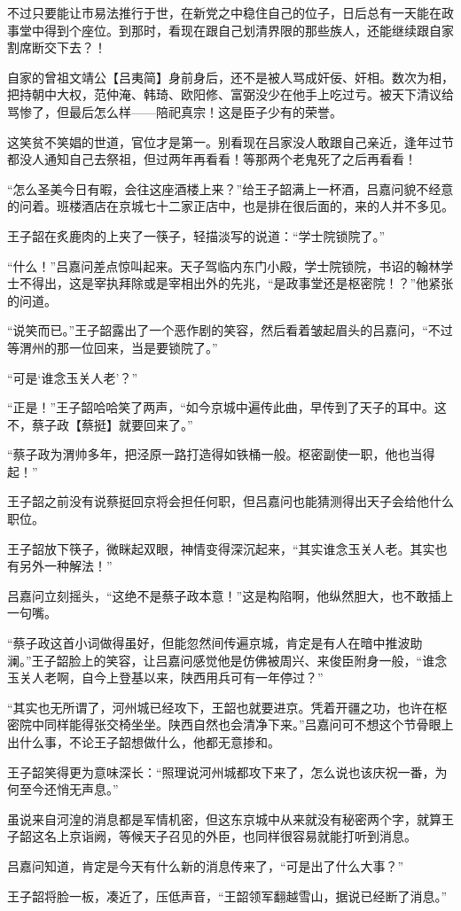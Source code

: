 不过只要能让市易法推行于世，在新党之中稳住自己的位子，日后总有一天能在政事堂中得到个座位。到那时，看现在跟自己划清界限的那些族人，还能继续跟自家割席断交下去？！

自家的曾祖文靖公【吕夷简】身前身后，还不是被人骂成奸佞、奸相。数次为相，把持朝中大权，范仲淹、韩琦、欧阳修、富弼没少在他手上吃过亏。被天下清议给骂惨了，但最后怎么样——陪祀真宗！这是臣子少有的荣誉。

这笑贫不笑娼的世道，官位才是第一。别看现在吕家没人敢跟自己亲近，逢年过节都没人通知自己去祭祖，但过两年再看看！等那两个老鬼死了之后再看看！

“怎么圣美今日有暇，会往这座酒楼上来？”给王子韶满上一杯酒，吕嘉问貌不经意的问着。班楼酒店在京城七十二家正店中，也是排在很后面的，来的人并不多见。

王子韶在炙鹿肉的上夹了一筷子，轻描淡写的说道：“学士院锁院了。”

“什么！”吕嘉问差点惊叫起来。天子驾临内东门小殿，学士院锁院，书诏的翰林学士不得出，这是宰执拜除或是宰相出外的先兆，“是政事堂还是枢密院！？”他紧张的问道。

“说笑而已。”王子韶露出了一个恶作剧的笑容，然后看着皱起眉头的吕嘉问，“不过等渭州的那一位回来，当是要锁院了。”

“可是‘谁念玉关人老’？”

“正是！”王子韶哈哈笑了两声，“如今京城中遍传此曲，早传到了天子的耳中。这不，蔡子政【蔡挺】就要回来了。”

“蔡子政为渭帅多年，把泾原一路打造得如铁桶一般。枢密副使一职，他也当得起！”

王子韶之前没有说蔡挺回京将会担任何职，但吕嘉问也能猜测得出天子会给他什么职位。

王子韶放下筷子，微眯起双眼，神情变得深沉起来，“其实谁念玉关人老。其实也有另外一种解法！”

吕嘉问立刻摇头，“这绝不是蔡子政本意！”这是构陷啊，他纵然胆大，也不敢插上一句嘴。

“蔡子政这首小词做得虽好，但能忽然间传遍京城，肯定是有人在暗中推波助澜。”王子韶脸上的笑容，让吕嘉问感觉他是仿佛被周兴、来俊臣附身一般，“谁念玉关人老啊，自今上登基以来，陕西用兵可有一年停过？”

“其实也无所谓了，河州城已经攻下，王韶也就要进京。凭着开疆之功，也许在枢密院中同样能得张交椅坐坐。陕西自然也会清净下来。”吕嘉问可不想这个节骨眼上出什么事，不论王子韶想做什么，他都无意掺和。

王子韶笑得更为意味深长：“照理说河州城都攻下来了，怎么说也该庆祝一番，为何至今还悄无声息。”

虽说来自河湟的消息都是军情机密，但这东京城中从来就没有秘密两个字，就算王子韶这名上京诣阙，等候天子召见的外臣，也同样很容易就能打听到消息。

吕嘉问知道，肯定是今天有什么新的消息传来了，“可是出了什么大事？”

王子韶将脸一板，凑近了，压低声音，“王韶领军翻越雪山，据说已经断了消息。”


